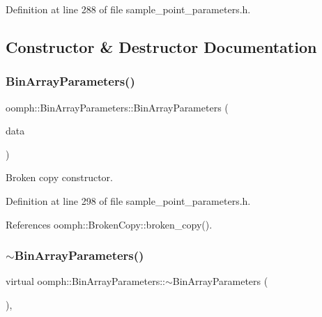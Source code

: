 Definition at line 288 of file sample\+\_\+point\+\_\+parameters.\+h.



\subsection{Constructor \& Destructor Documentation}
\mbox{\label{classoomph_1_1BinArrayParameters_a5a1bf38b22afec8348b47d3ccbc9c2a9}} 
\subsubsection{\texorpdfstring{Bin\+Array\+Parameters()}{BinArrayParameters()}\hspace{0.1cm}{\footnotesize\ttfamily [1/3]}}
{\footnotesize\ttfamily oomph\+::\+Bin\+Array\+Parameters\+::\+Bin\+Array\+Parameters (\begin{DoxyParamCaption}\item[{const \hyperlink{classoomph_1_1BinArrayParameters}{Bin\+Array\+Parameters} \&}]{data }\end{DoxyParamCaption})\hspace{0.3cm}{\ttfamily [inline]}}



Broken copy constructor. 



Definition at line 298 of file sample\+\_\+point\+\_\+parameters.\+h.



References oomph\+::\+Broken\+Copy\+::broken\+\_\+copy().

\mbox{\label{classoomph_1_1BinArrayParameters_a55a4fb68a273000d3782364ccac09c3f}} 
\subsubsection{\texorpdfstring{$\sim$\+Bin\+Array\+Parameters()}{~BinArrayParameters()}}
{\footnotesize\ttfamily virtual oomph\+::\+Bin\+Array\+Parameters\+::$\sim$\+Bin\+Array\+Parameters (\begin{DoxyParamCaption}{ }\end{DoxyParamCaption})\hspace{0.3cm}{\ttfamily [inline]}, {\ttfamily [virtual]}}



